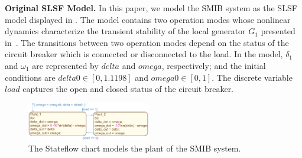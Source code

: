 \vspace{0.5em}
\noindent
{\bf Original SLSF Model.} In this paper, we model the SMIB system as the SLSF model displayed in . The model contains two operation modes whose nonlinear dynamics characterize the transient stability of the local generator $G_1$ presented in~\cite{farraj2014practical}. The transitions between two operation modes depend on the status of the circuit breaker which is connected or disconnected to the load. 
%
In the model, $\delta_1$ and $\omega_1$ are represented by $delta$ and $omega$, respectively; and the initial conditions are $delta0 \in [0, 1.1198]$ and $omega0 \in [0, 1]$. The discrete variable $load$ captures the open and closed status of the circuit breaker.
%

%
\begin{figure}[tbp]%
	\centering%
    \includegraphics[width=0.48\textwidth]{image/smib_plant_model}%
		\vspace{-1em}
	\caption{The Stateflow chart models the plant of the SMIB system.}%
	\vspace{-1em}
\end{figure}%
%
%
%
%

